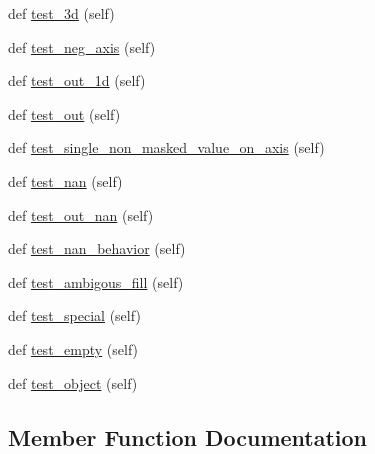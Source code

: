 \begin{DoxyCompactItemize}
\item 
def \hyperlink{classnumpy_1_1ma_1_1tests_1_1test__extras_1_1TestMedian_a8469fa50dd26d6024c24d8241c194a01}{test\+\_\+3d} (self)
\item 
def \hyperlink{classnumpy_1_1ma_1_1tests_1_1test__extras_1_1TestMedian_a8c58fc956125f82568a135ea8e11e847}{test\+\_\+neg\+\_\+axis} (self)
\item 
def \hyperlink{classnumpy_1_1ma_1_1tests_1_1test__extras_1_1TestMedian_a1f5b0411000a21e2019dfa69bc43d236}{test\+\_\+out\+\_\+1d} (self)
\item 
def \hyperlink{classnumpy_1_1ma_1_1tests_1_1test__extras_1_1TestMedian_ab22e3c985d03b0803dd3bcaf8c147ad4}{test\+\_\+out} (self)
\item 
def \hyperlink{classnumpy_1_1ma_1_1tests_1_1test__extras_1_1TestMedian_ad4a93493eb04055dec0151345bf4117f}{test\+\_\+single\+\_\+non\+\_\+masked\+\_\+value\+\_\+on\+\_\+axis} (self)
\item 
def \hyperlink{classnumpy_1_1ma_1_1tests_1_1test__extras_1_1TestMedian_aafaf6884ed7d376e9a7d2e3a042494fa}{test\+\_\+nan} (self)
\item 
def \hyperlink{classnumpy_1_1ma_1_1tests_1_1test__extras_1_1TestMedian_a00ca8e28170fc18165e0e9fd70d7638f}{test\+\_\+out\+\_\+nan} (self)
\item 
def \hyperlink{classnumpy_1_1ma_1_1tests_1_1test__extras_1_1TestMedian_accf95836cc95e215bebcaa326fab9962}{test\+\_\+nan\+\_\+behavior} (self)
\item 
def \hyperlink{classnumpy_1_1ma_1_1tests_1_1test__extras_1_1TestMedian_af2a14014b3b2536ea6ab3c9a95146c0b}{test\+\_\+ambigous\+\_\+fill} (self)
\item 
def \hyperlink{classnumpy_1_1ma_1_1tests_1_1test__extras_1_1TestMedian_ac389d11a9d33e44de6e0531464c62f69}{test\+\_\+special} (self)
\item 
def \hyperlink{classnumpy_1_1ma_1_1tests_1_1test__extras_1_1TestMedian_afa39b6d9febf4acefe7ab078b4f248c3}{test\+\_\+empty} (self)
\item 
def \hyperlink{classnumpy_1_1ma_1_1tests_1_1test__extras_1_1TestMedian_ad883054bdb859eba723383bd05330bdc}{test\+\_\+object} (self)
\end{DoxyCompactItemize}


\subsection{Member Function Documentation}
\mbox{\label{classnumpy_1_1ma_1_1tests_1_1test__extras_1_1TestMedian_a5ac6e1cd9b3a1bedb017373a09cabde0}} 
